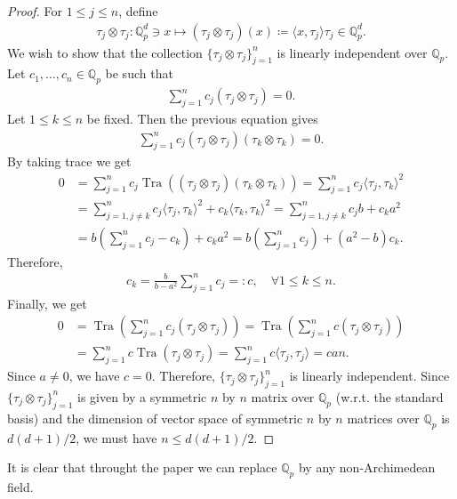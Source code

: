 \documentclass{amsart}
\begin{document}
\begin{proof}
	For $1\leq j \leq n$, define 
	\begin{align*}
		\tau_j \otimes \tau_j: \mathbb{Q}^d_p \ni x \mapsto(\tau_j \otimes \tau_j)(x)\coloneqq \langle x, \tau_j\rangle \tau_j \in \mathbb{Q}^d_p.
	\end{align*}
	We wish to show that the collection $\{\tau_j \otimes \tau_j\}_{j=1}^n$   is linearly independent  over  $ \mathbb{Q}_p$. Let $c_1, \dots,  c_n \in  \mathbb{Q}_p$ be such that 
	\begin{align*}
		\sum_{j=1}^{n}c_j(\tau_j \otimes \tau_j)=0.
	\end{align*}
	Let $1\leq k \leq n$ be fixed. Then the previous equation gives 
	\begin{align*}
		\sum_{j=1}^{n}c_j(\tau_j \otimes \tau_j)(\tau_k \otimes \tau_k)	=0.
	\end{align*}
	By taking trace we get
	\begin{align*}
		0&=\sum_{j=1}^{n}c_j\operatorname{Tra}((\tau_j \otimes \tau_j)(\tau_k \otimes \tau_k))=\sum_{j=1}^{n}c_j\langle \tau_j, \tau_k\rangle^2\\
		&=\sum_{j=1, j \neq k}^{n}c_j\langle \tau_j, \tau_k\rangle^2+c_k\langle \tau_k, \tau_k\rangle^2=\sum_{j=1, j \neq k}^{n}c_jb+c_ka^2\\
		&=b\left(\sum_{j=1}^{n}c_j-c_k\right)+c_ka^2=b\left(\sum_{j=1}^{n}c_j\right)+(a^2-b)c_k.
	\end{align*}
	Therefore, 
	\begin{align*}
		c_k=\frac{b}{b-a^2}\sum_{j=1}^{n}c_j=:c, \quad \forall 1\le k \leq n.	
	\end{align*}
	Finally, we get 
	\begin{align*}
		0&=\operatorname{Tra}\left(\sum_{j=1}^{n}c_j(\tau_j \otimes \tau_j)\right)=\operatorname{Tra}\left(\sum_{j=1}^{n}c(\tau_j \otimes \tau_j)\right)\\
		&=\sum_{j=1}^{n}c\operatorname{Tra}(\tau_j \otimes \tau_j)=\sum_{j=1}^{n}c\langle \tau_j, \tau_j\rangle=can.
	\end{align*}
	Since $a\neq 0$, we have $c=0$. Therefore, $\{\tau_j \otimes \tau_j\}_{j=1}^n$ is linearly independent.  Since $\{\tau_j \otimes \tau_j\}_{j=1}^n$ is given by a symmetric $n$ by $n$ matrix over $\mathbb{Q}_p$ (w.r.t. the standard basis) and the dimension of vector space of symmetric $n$ by $n$ matrices  over $\mathbb{Q}_p$ is $d(d+1)/2$,  we must have $n\leq d(d+1)/2$.
\end{proof}
It is clear that throught the paper we can replace $\mathbb{Q}_p$ by any non-Archimedean field. 
\end{document}
